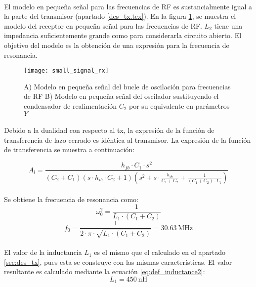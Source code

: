 \paragraph{}
El modelo en pequeña señal para las frecuencias de RF es sustancialmente igual a la parte del transmisor (apartado \ref{des_tx.tex}). En la figura \ref{fig:ss_rx}, se muestra el modelo del receptor en pequeña señal para las frecuencias de RF. $L_2$ tiene una impedancia suficientemente grande como para considerarla circuito abierto. El objetivo del modelo es la obtención de una expresión para la frecuencia de resonancia.

\begin{figure}[h]
    \centering
    \texttt{[image: small\_signal\_rx]}
    \caption{A) Modelo en pequeña señal del bucle de oscilación para frecuencias de RF B) Modelo en pequeña señal del oscilador sustituyendo el condensador de realimentación $C_2$ por su equivalente en parámetros $Y$}
    \label{fig:ss_rx}
\end{figure}

\paragraph{}
Debido a la dualidad con respecto al tx, la expresión de la función de transferencia de lazo cerrado es idéntica al transmisor. La expresi\'on de la funci\'on de transferencia se muestra a continuaci\'on:

\begin{equation}
   \label{eq:Al_tx}
   A_l = \frac{h_{fb} \cdot C_1 \cdot s^2}{ \left( C_2+C_1 \right) \left( s \cdot h_{ib} \cdot C_2 + 1\right) \left( s^2 + s \cdot \frac{h_{ob}}{C_1 + C_2} + \frac{1}{(C_1 + C_2)\cdot L_1}\right) }
\end{equation}

\paragraph{}
Se obtiene la frecuencia de resonancia como: $$\omega_0^2 = \frac{1}{L_1 \cdot (C_1 + C_2)}$$
$$ f_0 = \frac{1}{2 \cdot \pi \cdot \sqrt{L_1 \cdot (C_1 + C_2)}} = \SI{30.63}{\mega\hertz} $$
\paragraph{}
El valor de la inductancia $L_1$ es el mismo que el calculado en el apartado \ref{sec:des_tx}, pues esta se construye con las mismas caracter\'isticas. El valor resultante es calculado mediante la ecuaci\'on \ref{eq:def_inductance2}:
$$ L_1 = \SI{450}{\nano\henry} $$


